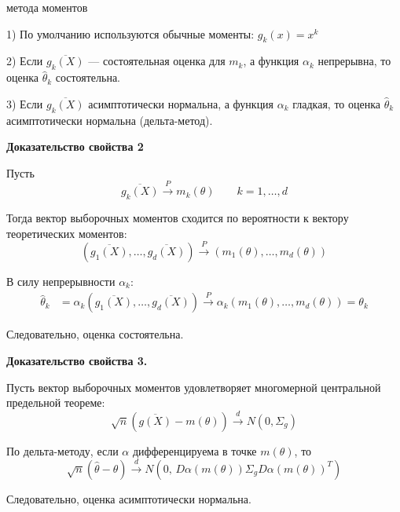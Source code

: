 \documentclass[12pt,a4paper]{article}
\begin{document}
\begin{props}{метода моментов}

1) По умолчанию используются обычные моменты: $g_k(x)=x^k$

2) Если $\overline{g_k(X)}$ — состоятельная оценка для $m_k$, а функция $\alpha_k$ непрерывна, то оценка $\hat{\theta}_k$ состоятельна.

3) Если $\overline{g_k(X)}$ асимптотически нормальна, а функция $\alpha_k$ гладкая, то оценка $\hat{\theta}_k$ асимптотически нормальна (дельта-метод).

\end{props}

\textbf{Доказательство свойства 2}

\begin{proofbox}

Пусть
\[
\overline{g_k(X)}
\xrightarrow{P}
m_k(\theta)
\qquad k=1,\ldots,d
\]

Тогда вектор выборочных моментов сходится по вероятности к вектору теоретических моментов:
\[
\left(
\overline{g_1(X)},\ldots,\overline{g_d(X)}
\right)
\xrightarrow{P}
(m_1(\theta),\ldots,m_d(\theta))
\]

В силу непрерывности $\alpha_k$:
\[
\begin{aligned}
\hat{\theta}_k
&=
\alpha_k\left(
\overline{g_1(X)},\ldots,
\overline{g_d(X)}
\right)
\xrightarrow{P}
\alpha_k(m_1(\theta),\ldots,m_d(\theta))
=\theta_k
\end{aligned}
\]

Следовательно, оценка состоятельна.

\end{proofbox}

\textbf{Доказательство свойства 3.}

\begin{proofbox}

Пусть вектор выборочных моментов удовлетворяет многомерной центральной предельной теореме:
\[
\sqrt{n}(\overline{g(X)}-m(\theta))
\xrightarrow{d}N(0,\Sigma_g)
\]

По дельта-методу, если $\alpha$ дифференцируема в точке $m(\theta)$, то
\[
\sqrt{n}(\hat{\theta}-\theta)
\xrightarrow{d}
N\left(
0,\,
D\alpha(m(\theta))
\Sigma_g
D\alpha(m(\theta))^T
\right)
\]

Следовательно, оценка асимптотически нормальна.

\end{proofbox}
\end{document}
